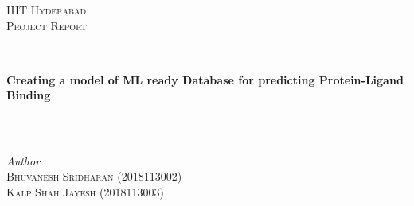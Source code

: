 \documentclass[12pt]{article}%
\begin{document}
\begin{titlepage} %
	\newcommand{\HRule}{\rule{\linewidth}{0.5mm}} %
	
	\center %
	
	
	\textsc{\LARGE IIIT Hyderabad}\\[1.5cm] %
	
	\textsc{\Large Project Report}\\[0.5cm] %
	
	
	
	\HRule\\[0.4cm]
	
	{\huge\bfseries Creating a model of ML ready Database for predicting Protein-Ligand Binding}\\[0.4cm] %
	
	\HRule\\[1.5cm]
	
	
	\begin{minipage}{0.55\textwidth}
		\begin{flushleft}
			\large
			\textit{Author}\\
			 	\textsc{Bhuvanesh Sridharan (2018113002)} \\
			 	\textsc{Kalp Shah Jayesh (2018113003)} %
		\end{flushleft}
	\end{minipage}
	~
	\begin{minipage}{0.4\textwidth}
		\begin{flushright}
			\large
		\end{flushright}
	\end{minipage}
	

\end{titlepage}
\end{document}
